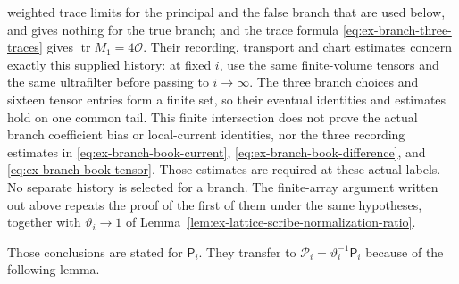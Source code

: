 weighted trace limits for the principal and the false branch that are
used below, and gives nothing for the true branch;
and the trace formula \eqref{eq:ex-branch-three-traces} gives
$\operatorname{tr}M_1=4\mathcal O$. Their recording, transport and chart
estimates concern exactly this supplied history: at fixed $i$, use the
same finite-volume tensors and the same ultrafilter before passing to
$i\to\infty$. The three branch choices and sixteen tensor entries form
a finite set, so their eventual identities and estimates hold on one
common tail. This finite intersection does not prove the actual branch
coefficient bias or local-current identities, nor the three recording
estimates in \eqref{eq:ex-branch-book-current},
\eqref{eq:ex-branch-book-difference}, and
\eqref{eq:ex-branch-book-tensor}. Those estimates are required at
these actual labels. No separate history is selected for a branch. The
finite-array argument written out above repeats the
proof of the first of them under the same hypotheses, together with
$\vartheta_i\to1$ of Lemma~\ref{lem:ex-lattice-scribe-normalization-ratio}.

Those conclusions are stated for $\mathsf P_i$. They transfer to
$\mathcal P_i=\vartheta_i^{-1}\mathsf P_i$ because of the following lemma.

